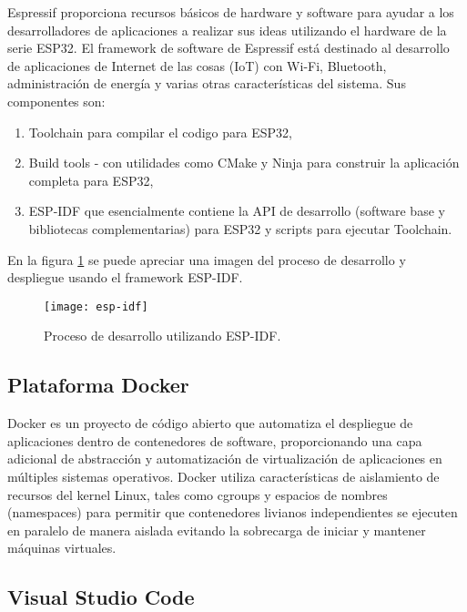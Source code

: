 Espressif proporciona recursos básicos de hardware y software para ayudar a los desarrolladores de aplicaciones a realizar sus ideas utilizando el hardware de la serie ESP32. El framework de software de Espressif está destinado al desarrollo de aplicaciones de Internet de las cosas (IoT) con Wi-Fi, Bluetooth, administración de energía y varias otras características del sistema.
Sus componentes son:
\begin{enumerate}
	\item Toolchain para compilar el codigo para ESP32,
	\item Build tools - con utilidades como CMake y Ninja para construir la aplicación completa para ESP32,
	\item ESP-IDF que esencialmente contiene la API de desarrollo (software base y bibliotecas complementarias) para ESP32 y scripts para ejecutar Toolchain.
	
\end{enumerate}
En la figura \ref{fig:esp-idf} se puede apreciar una imagen del proceso de desarrollo y despliegue usando el framework ESP-IDF.

\begin{figure}[h]
    \centering
    \texttt{[image: esp-idf]}
    \caption{Proceso de desarrollo utilizando ESP-IDF.}
    \label{fig:esp-idf}
\end{figure}


\subsection{Plataforma Docker}

Docker es un proyecto de código abierto que automatiza el despliegue de aplicaciones dentro de contenedores de software, proporcionando una capa adicional de abstracción y automatización de virtualización de aplicaciones en múltiples sistemas operativos.​ Docker utiliza características de aislamiento de recursos del kernel Linux, tales como cgroups y espacios de nombres (namespaces) para permitir que contenedores livianos independientes se ejecuten en paralelo de manera aislada evitando la sobrecarga de iniciar y mantener máquinas virtuales.


\subsection{Visual Studio Code}

